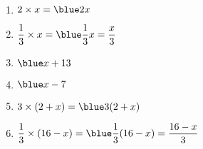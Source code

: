    \ \\ [-5mm]
   \begin{enumerate}
      \item $2\times x =\blue2x$ \smallskip
      \item $\dfrac13\times x =\blue\dfrac13x =\dfrac{x}{3}$ \smallskip
      \item $\blue x+13$
      \item $\blue x-7$
      \item $3\times(2+x) =\blue3(2+x)$
      \item $\dfrac13\times(16-x) =\blue\dfrac13(16-x) =\dfrac{16-x}{3}$
   \end{enumerate}
